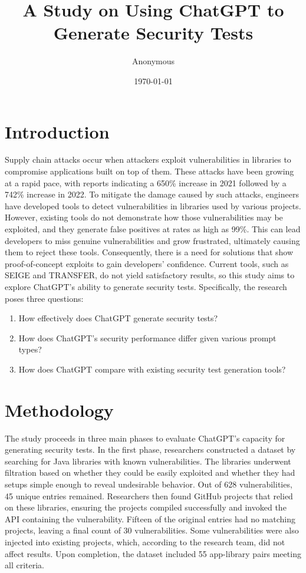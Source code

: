 \documentclass[12pt]{article}
\begin{document}
\title{A Study on Using ChatGPT to Generate Security Tests}
\author{Anonymous}
\date{\today}
\maketitle

\section{Introduction}
Supply chain attacks occur when attackers exploit vulnerabilities in libraries to compromise applications built on top of them. These attacks have been growing at a rapid pace, with reports indicating a 650\% increase in 2021 followed by a 742\% increase in 2022. To mitigate the damage caused by such attacks, engineers have developed tools to detect vulnerabilities in libraries used by various projects. However, existing tools do not demonstrate how those vulnerabilities may be exploited, and they generate false positives at rates as high as 99\%. This can lead developers to miss genuine vulnerabilities and grow frustrated, ultimately causing them to reject these tools. Consequently, there is a need for solutions that show proof-of-concept exploits to gain developers’ confidence. Current tools, such as SEIGE and TRANSFER, do not yield satisfactory results, so this study aims to explore ChatGPT’s ability to generate security tests. Specifically, the research poses three questions:
\begin{enumerate}
\item How effectively does ChatGPT generate security tests?
\item How does ChatGPT’s security performance differ given various prompt types?
\item How does ChatGPT compare with existing security test generation tools?
\end{enumerate}

\section{Methodology}
The study proceeds in three main phases to evaluate ChatGPT's capacity for generating security tests. In the first phase, researchers constructed a dataset by searching for Java libraries with known vulnerabilities. The libraries underwent filtration based on whether they could be easily exploited and whether they had setups simple enough to reveal undesirable behavior. Out of 628 vulnerabilities, 45 unique entries remained. Researchers then found GitHub projects that relied on these libraries, ensuring the projects compiled successfully and invoked the API containing the vulnerability. Fifteen of the original entries had no matching projects, leaving a final count of 30 vulnerabilities. Some vulnerabilities were also injected into existing projects, which, according to the research team, did not affect results. Upon completion, the dataset included 55 app-library pairs meeting all criteria.
\end{document}
